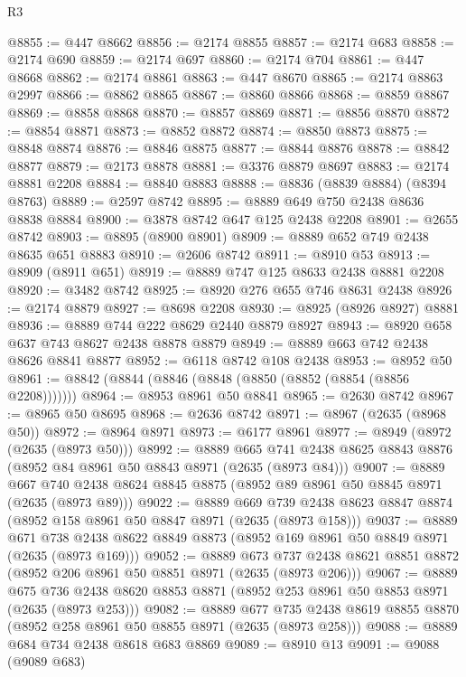 \begin{lexlean}{R3}
\begin{coremodule}
@8855 := @447 @8662
@8856 := @2174 @8855
@8857 := @2174 @683
@8858 := @2174 @690
@8859 := @2174 @697
@8860 := @2174 @704
@8861 := @447 @8668
@8862 := @2174 @8861
@8863 := @447 @8670
@8865 := @2174 @8863 @2997
@8866 := @8862 @8865
@8867 := @8860 @8866
@8868 := @8859 @8867
@8869 := @8858 @8868
@8870 := @8857 @8869
@8871 := @8856 @8870
@8872 := @8854 @8871
@8873 := @8852 @8872
@8874 := @8850 @8873
@8875 := @8848 @8874
@8876 := @8846 @8875
@8877 := @8844 @8876
@8878 := @8842 @8877
@8879 := @2173 @8878
@8881 := @3376 @8879 @8697
@8883 := @2174 @8881 @2208
@8884 := @8840 @8883
@8888 := @8836 (@8839 @8884) (@8394 @8763)
@8889 := @2597 @8742
@8895 := @8889 @649 @750 @2438 @8636 @8838 @8884
@8900 := @3878 @8742 @647 @125 @2438 @2208
@8901 := @2655 @8742
@8903 := @8895 (@8900 @8901)
@8909 := @8889 @652 @749 @2438 @8635 @651 @8883
@8910 := @2606 @8742
@8911 := @8910 @53
@8913 := @8909 (@8911 @651)
@8919 := @8889 @747 @125 @8633 @2438 @8881 @2208
@8920 := @3482 @8742
@8925 := @8920 @276 @655 @746 @8631 @2438
@8926 := @2174 @8879
@8927 := @8698 @2208
@8930 := @8925 (@8926 @8927) @8881
@8936 := @8889 @744 @222 @8629 @2440 @8879 @8927
@8943 := @8920 @658 @637 @743 @8627 @2438 @8878 @8879
@8949 := @8889 @663 @742 @2438 @8626 @8841 @8877
@8952 := @6118 @8742 @108 @2438
@8953 := @8952 @50
@8961 := @8842 (@8844 (@8846 (@8848 (@8850 (@8852 (@8854 (@8856 @2208)))))))
@8964 := @8953 @8961 @50 @8841
@8965 := @2630 @8742
@8967 := @8965 @50 @8695
@8968 := @2636 @8742
@8971 := @8967 (@2635 (@8968 @50))
@8972 := @8964 @8971
@8973 := @6177 @8961
@8977 := @8949 (@8972 (@2635 (@8973 @50)))
@8992 := @8889
    @665
    @741
    @2438
    @8625
    @8843
    @8876
    (@8952 @84 @8961 @50 @8843 @8971 (@2635 (@8973 @84)))
@9007 := @8889
    @667
    @740
    @2438
    @8624
    @8845
    @8875
    (@8952 @89 @8961 @50 @8845 @8971 (@2635 (@8973 @89)))
@9022 := @8889
    @669
    @739
    @2438
    @8623
    @8847
    @8874
    (@8952 @158 @8961 @50 @8847 @8971 (@2635 (@8973 @158)))
@9037 := @8889
    @671
    @738
    @2438
    @8622
    @8849
    @8873
    (@8952 @169 @8961 @50 @8849 @8971 (@2635 (@8973 @169)))
@9052 := @8889
    @673
    @737
    @2438
    @8621
    @8851
    @8872
    (@8952 @206 @8961 @50 @8851 @8971 (@2635 (@8973 @206)))
@9067 := @8889
    @675
    @736
    @2438
    @8620
    @8853
    @8871
    (@8952 @253 @8961 @50 @8853 @8971 (@2635 (@8973 @253)))
@9082 := @8889
    @677
    @735
    @2438
    @8619
    @8855
    @8870
    (@8952 @258 @8961 @50 @8855 @8971 (@2635 (@8973 @258)))
@9088 := @8889 @684 @734 @2438 @8618 @683 @8869
@9089 := @8910 @13
@9091 := @9088 (@9089 @683)

\end{coremodule}
\end{lexlean}
